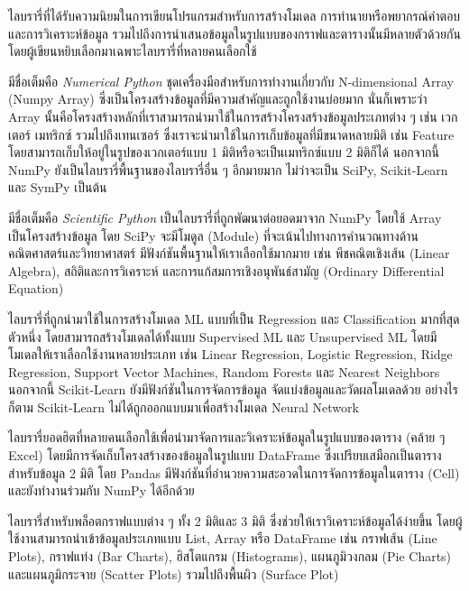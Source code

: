 ไลบรารี่ที่ได้รับความนิยมในการเขียนโปรแกรมสำหรับการสร้างโมเดล การทำนายหรือพยากรณ์คำตอบ และการวิเคราะห์ข้อมูล รวมไปถึงการนำเสนอข้อมูลในรูปแบบของกราฟและตารางนั้นมีหลายตัวด้วยกัน โดยผู้เขียนหยิบเลือกมาเฉพาะไลบรารี่ที่หลายคนเลือกใช้
%
\begin{description}[topsep=0pt,noitemsep]\setlength\itemsep{0.5em}
    \item[NumPy] มีชื่อเต็มคือ \textit{Numerical Python} ชุดเครื่องมือสำหรับการทำงานเกี่ยวกับ N-dimensional Array (Numpy Array) ซึ่งเป็นโครงสร้างข้อมูลที่มีความสำคัญและถูกใช้งานบ่อยมาก นั่นก็เพราะว่า Array นั้นคือโครงสร้างหลักที่เราสามารถนำมาใช้ในการสร้างโครงสร้างข้อมูลประเภทต่าง ๆ เช่น เวกเตอร์ เมทริกซ์ รวมไปถึงเทนเซอร์ ซึ่งเราจะนำมาใช้ในการเก็บข้อมูลที่มีขนาดหลายมิติ เช่น Feature โดยสามารถเก็บให้อยู่ในรูปของเวกเตอร์แบบ 1 มิติหรือจะเป็นเมทริกซ์แบบ 2 มิติก็ได้ นอกจากนี้ NumPy ยังเป็นไลบรารี่พื้นฐานของไลบรารี่อื่น ๆ อีกมายมาก ไม่ว่าจะเป็น SciPy, Scikit-Learn และ SymPy เป็นต้น

    \item[SciPy] มีชื่อเต็มคือ \textit{Scientific Python} เป็นไลบรารี่ที่ถูกพัฒนาต่อยอดมาจาก NumPy โดยใช้ Array เป็นโครงสร้างข้อมูล โดย SciPy จะมีโมดูล (Module) ที่จะเน้นไปทางการคำนวณทางด้านคณิตศาสตร์และวิทยาศาสตร์ มีฟังก์ชันพื้นฐานให้เราเลือกใช้มากมาย เช่น พีชคณิตเชิงเส้น (Linear Algebra), สถิติและการวิเคราะห์ และการแก้สมการเชิงอนุพันธ์สามัญ (Ordinary Differential Equation) 

    \item[Scikit-Learn] ไลบรารี่ที่ถูกนำมาใช้ในการสร้างโมเดล ML แบบที่เป็น Regression และ Classification มากที่สุดตัวหนึ่ง โดยสามารถสร้างโมเดลได้ทั้งแบบ Supervised ML และ Unsupervised ML โดยมีโมเดลให้เราเลือกใช้งานหลายประเภท เช่น Linear Regression, Logistic Regression, Ridge Regression, Support Vector Machines, Random Forests และ Nearest Neighbors นอกจากนี้ Scikit-Learn ยังมีฟังก์ชันในการจัดการข้อมูล จัดแบ่งข้อมูลและวัดผลโมเดลด้วย อย่างไรก็ตาม Scikit-Learn ไม่ได้ถูกออกแบบมาเพื่อสร้างโมเดล Neural Network

    \item[Pandas] ไลบรารี่ยอดฮิตที่หลายคนเลือกใช้เพื่อนำมาจัดการและวิเคราะห์ข้อมูลในรูปแบบของตาราง (คล้าย ๆ Excel) โดยมีการจัดเก็บโครงสร้างของข้อมูลในรูปแบบ DataFrame ซึ่งเปรียบเสมือกเป็นตารางสำหรับข้อมูล 2 มิติ โดย Pandas มีฟังก์ชันที่อำนวยความสะอวดในการจัดการข้อมูลในตาราง (Cell) และยังทำงานร่วมกับ NumPy ได้อีกด้วย

    \item[Matplotlib] ไลบรารี่สำหรับพล็อตกราฟแบบต่าง ๆ ทั้ง 2 มิติและ 3 มิติ ซึ่งช่วยให้เราวิเคราะห์ข้อมูลได้ง่ายขึ้น โดยผู้ใช้งานสามารถนำเข้าข้อมูลประเภทแบบ List, Array หรือ DataFrame เช่น กราฟเส้น (Line Plots), กราฟแท่ง (Bar Charts), ฮิสโตแกรม (Histograms), แผนภูมิวงกลม (Pie Charts) และแผนภูมิกระจาย (Scatter Plots) รวมไปถึงพื้นผิว (Surface Plot)


\end{description}
